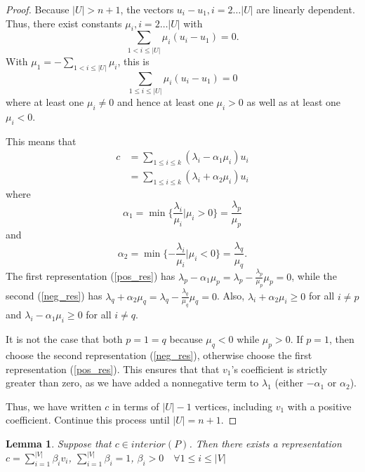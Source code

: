 \documentclass{article}
\newtheorem{lemma}[theorem]{Lemma}
\theoremstyle{case}
\let\oldref\ref
\renewcommand{\ref}[1]{(\oldref{#1})}
\begin{document}
\begin{proof}
Because $|U|>n+1$, the vectors $u_{i} - u_1, i=2\ldots |U|$ are linearly dependent.
Thus, there exist constants $\mu_i,i=2\ldots |U|$ with
\[
\sum_{1 < i \le |U|}\mu_i(u_i - u_1) = 0.
\]
With $\mu_1 = -\sum_{1<i\le|U|}\mu_i$, this is
\[
\sum_{1 \le i \le |U|}\mu_i(u_i - u_1) = 0
\]
 where at least one $\mu_i \ne 0$ and hence at least one $\mu_i > 0$ as well as at least one $\mu_i < 0$.

This means that 
\begin{align}
c &= \sum_{1\le i \le k }(\lambda_i - \alpha_1\mu_i)u_i \label{pos_res} \\
  &= \sum_{1\le i \le k }(\lambda_i + \alpha_2\mu_i)u_i \label{neg_res}
\end{align}
where 
\[\alpha_1 = \min\{ \frac{\lambda_i}{\mu_i}|\mu_i > 0\} = \frac{\lambda_p}{\mu_p}\] and 
\[\alpha_2 = \min\{-\frac{\lambda_i}{\mu_i}|\mu_i < 0\}= \frac{\lambda_q}{\mu_q}.\]
The first representation \ref{pos_res} has $\lambda_p - \alpha_1\mu_p = \lambda_p - \frac{\lambda_p}{\mu_p}\mu_p = 0$,
while the second \ref{neg_res} has
$\lambda_q + \alpha_2\mu_q = \lambda_q - \frac{\lambda_q}{\mu_q}\mu_q = 0$.
Also, 
$\lambda_i + \alpha_2\mu_i \ge 0$ for all $i\ne p$ and $\lambda_i - \alpha_1\mu_i \ge 0$ for all $i\ne q$.

It is not the case that both $p=1=q$ because $\mu_q < 0$ while $\mu_p > 0$.
If $p=1$, then choose the second representation \ref{neg_res}, otherwise choose the first representation \ref{pos_res}.
This ensures that that $v_1$'s coefficient is strictly greater than zero, as we have added a nonnegative term to $\lambda_1$ (either $-\alpha_1$ or $\alpha_2$).

Thus, we have written $c$ in terms of $|U|-1$ vertices, including $v_1$ with a positive coefficient.
Continue this process until $|U| = n+1$.

\end{proof}

\begin{lemma}
\label{all_positive}
Suppose that $c \in interior(P)$.
Then there exists a representation $c = \sum_{i=1}^{|V|} \beta_i v_i$, $\sum_{i=1}^{|V|} \beta_i =1$,
$\beta_i > 0 \quad \forall 1\le i \le |V|$
\end{lemma}
\end{document}
